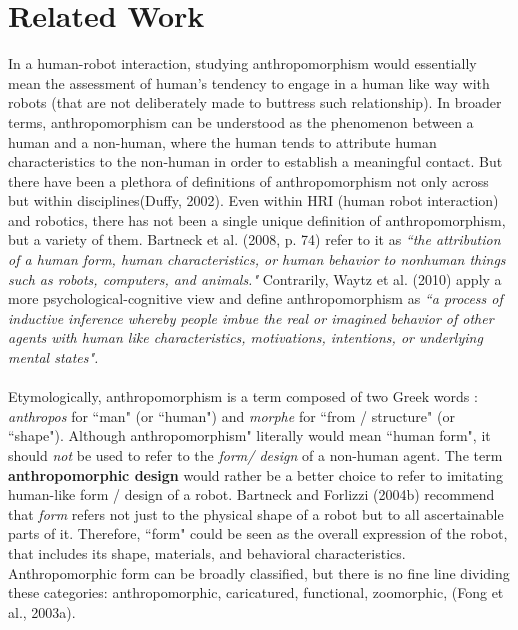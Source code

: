 \documentclass{acm_proc_article-sp}
\begin{document}
\section{Related Work}

In a human-robot interaction, studying anthropomorphism would essentially mean
the assessment of human's tendency to engage in a human like way with robots
(that are not deliberately made to buttress such relationship). In broader
terms, anthropomorphism can be understood as the phenomenon between a human and
a non-human, where the human tends to attribute human characteristics to the
non-human in order to establish a meaningful contact\cite{c9}. But there have
been a plethora of definitions of anthropomorphism not only across but within
disciplines(Duffy, 2002)\cite{mc1}. Even within HRI (human robot interaction)
and robotics, there has not been a single unique definition of anthropomorphism,
but a variety of them. Bartneck et al. (2008, p. 74)\cite{mc2} refer to it as
\textit{``the attribution of a human form, human characteristics, or human
behavior to nonhuman things such as robots, computers, and animals."}
Contrarily, Waytz et al. (2010)\cite{c2} apply a more psychological-cognitive
view and define anthropomorphism as \textit{``a process of inductive inference
whereby people imbue the real or imagined behavior of other agents with human
like characteristics, motivations, intentions, or underlying mental states".} \\
\\ Etymologically, anthropomorphism is a term composed of two Greek words :
\textit{anthropos} for ``man" (or ``human") and \textit{morphe} for ``from /
structure" (or ``shape"). Although anthropomorphism" literally would mean
``human form", it should \textit{not} be used to refer to the \textit{form/
design} of a non-human agent. The term \textbf{anthropomorphic design} would
rather be a better choice to refer to imitating human-like form / design of a
robot. Bartneck and Forlizzi (2004b)\cite{c3} recommend that \textit{form}
refers not just to the physical shape of a robot but to all ascertainable parts
of it. Therefore, ``form" could be seen as the overall expression of the robot,
that includes its shape, materials, and behavioral characteristics.
Anthropomorphic form can be broadly classified, but there is no fine line
dividing these categories: anthropomorphic, caricatured, functional,
zoomorphic, (Fong et al., 2003a)\cite{c4}.
\end{document}
